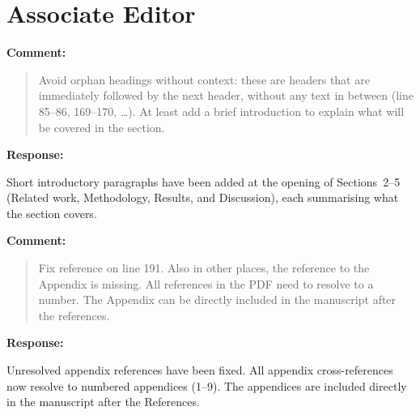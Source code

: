 \documentclass[11pt,a4paper]{article}
\newcommand{\MSRuntimeTable}{Table~8}
\newcommand{\MSErrorCompositionTable}{Table~10}
\newcommand{\MSSOTATable}{Table~11}
\newcommand{\MSErrorMechanismFigure}{Fig.~11}
\newcommand{\MSErrorMapFigure}{Fig.~12}
\newcommand{\MSAppendixRepeatability}{Appendix~7}
\newenvironment{commentblock}{%
  \par\smallskip\noindent\textbf{Comment:}\par
  \begin{quote}\itshape\color{black}
}{%
  \end{quote}\smallskip
}
\newenvironment{responseblock}{%
  \par\smallskip\noindent\textbf{Response:}\par
  \begingroup\color{responsegreen}
}{%
  \endgroup\smallskip
}
\begin{document}

\section*{Associate Editor}

\begin{commentblock}
Avoid orphan headings without context: these are headers that are immediately followed by the next header, without any text in between (line 85--86, 169--170, \ldots). At least add a brief introduction to explain what will be covered in the section.
\end{commentblock}
\begin{responseblock}
Short introductory paragraphs have been added at the opening of Sections~2--5 (Related work, Methodology, Results, and Discussion), each summarising what the section covers.
\end{responseblock}

\begin{commentblock}
Fix reference on line 191. Also in other places, the reference to the Appendix is missing. All references in the PDF need to resolve to a number. The Appendix can be directly included in the manuscript after the references.
\end{commentblock}
\begin{responseblock}
Unresolved appendix references have been fixed. All appendix cross-references now resolve to numbered appendices (1--9). The appendices are included directly in the manuscript after the References.
\end{responseblock}
\end{document}
